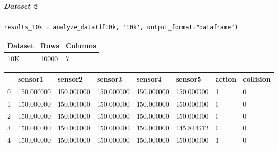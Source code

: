 \bigskip

\subparagraph{Dataset 2}

\begin{verbatim}
results_10k = analyze_data(df10k, '10k', output_format="dataframe")
\end{verbatim}

\bigskip\noindent
\begin{tabular}{p{}p{}p{}}
\toprule
Dataset & Rows & Columns \\
\hline
10K & 10000 & 7 \\
\bottomrule
\end{tabular}

\bigskip

\bigskip\noindent
\begin{tabular}{p{}p{}p{}p{}p{}p{}p{}p{}}
\toprule
~ & sensor1 & sensor2 & sensor3 & sensor4 & sensor5 & action & collision \\
\hline
0 & 150.000000 & 150.000000 & 150.000000 & 150.000000 & 150.000000 & 1 & 0 \\
\hline
1 & 150.000000 & 150.000000 & 150.000000 & 150.000000 & 150.000000 & 0 & 0 \\
\hline
2 & 150.000000 & 150.000000 & 150.000000 & 150.000000 & 150.000000 & 0 & 0 \\
\hline
3 & 150.000000 & 150.000000 & 150.000000 & 150.000000 & 145.844612 & 0 & 0 \\
\hline
4 & 150.000000 & 150.000000 & 150.000000 & 150.000000 & 150.000000 & 1 & 0 \\
\hline
\bottomrule
\end{tabular}

\bigskip

